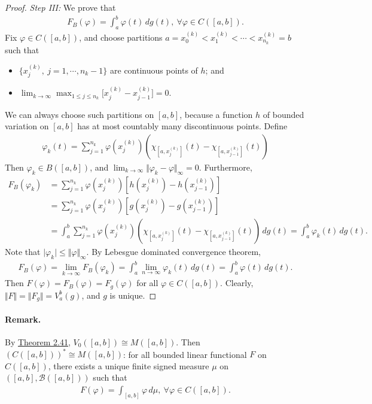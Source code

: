 \documentclass{article}
\begin{document}
\begin{proof}
\textit{Step III:} We prove that
\begin{align*}
	F_B(\varphi) = \int_a^b \varphi(t)\,dg(t),\ \forall\varphi\in C([a,b]).
\end{align*}
Fix $\varphi\in C([a,b])$, and choose partitions $a=x_0^{(k)} < x_1^{(k)} < \cdots < x_{n_k}^{(k)} = b$ such that
\begin{itemize}
	\vspace{0.05cm}
	\item $\bigl\{x_j^{(k)},\ j=1,\cdots,n_k-1\bigr\}$ are continuous points of $h$; and
	\vspace{0.05cm}
	\item $\lim_{k\to\infty}\max_{1\leq j\leq n_k} \bigl[x_j^{(k)} - x_{j-1}^{(k)}\bigr] = 0$.\vspace{0.1cm}
\end{itemize}
We can always choose such partitions on $[a,b]$, because a function $h$ of bounded variation on $[a,b]$ has at most countably many discontinuous points. Define
\begin{align*}
	\varphi_k(t) = \sum_{j=1}^{n_k}\varphi(x_j^{(k)})\left(\chi_{[a,x_j^{(k)}]}(t) - \chi_{[a,x_{j-1}^{(k)}]}(t)\right)
\end{align*}
Then $\varphi_k\in B([a,b])$, and $\lim_{k\to\infty}\Vert \varphi_k - \varphi\Vert_\infty = 0$. Furthermore,
\begin{align*}
	F_B(\varphi_k) &= \sum_{j=1}^{n_k}\varphi(x_j^{(k)})\left[h(x_j^{(k)}) - h(x_{j-1}^{(k)})\right]\\
	&= \sum_{j=1}^{n_k}\varphi(x_j^{(k)})\left[g(x_j^{(k)}) - g(x_{j-1}^{(k)})\right]\\
	&= \int_a^b \sum_{j=1}^{n_k}\varphi(x_j^{(k)})\left(\chi_{[a,x_j^{(k)}]}(t) - \chi_{[a,x_{j-1}^{(k)}]}(t)\right)\,dg(t) = \int_a^b\varphi_k(t)\,dg(t).
\end{align*}
Note that $\vert\varphi_k\vert\leq \Vert\varphi\Vert_\infty$. By Lebesgue dominated convergence theorem, 
\begin{align*}
	F_B(\varphi) = \lim_{k\to\infty}F_B(\varphi_k) = \int_a^b\lim_{n\to\infty}\varphi_k(t)\,dg(t) = \int_a^b\varphi(t)\,dg(t).
\end{align*}
Then $F(\varphi)=F_B(\varphi) = F_g(\varphi)$ for all $\varphi\in C([a,b])$. Clearly, $\Vert F\Vert = \Vert F_g\Vert = V_a^b(g)$, and $g$ is unique.
\end{proof}

\paragraph{Remark.} By \hyperref[thm:2.41]{Theorem 2.41}, $V_0([a,b])\cong M([a,b])$. Then $(C([a,b]))^*\cong M([a,b])$: for all bounded linear functional $F$ on $C([a,b])$, there exists a unique finite signed measure $\mu$ on $([a,b],\mathscr{B}([a,b]))$ such that
\begin{align*}
	F(\varphi) = \int_{[a,b]}\varphi\,d\mu,\ \forall\varphi\in C([a,b]).
\end{align*}
\end{document}

